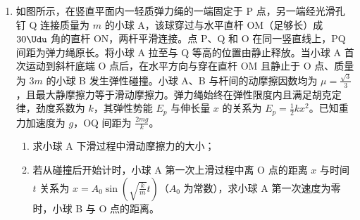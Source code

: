\documentclass[\gkver]{gaokaozhenti}
\begin{document}
\begin{enumerate}
{\begin{enumerate}
\item
$45\Udu$
\end{enumerate}
}

\item
如图所示，在竖直平面内一轻质弹力绳的一端固定于 P 点，另一端经光滑孔钉 Q 连接质量为 $m$ 的小球 A，该球穿过与水平直杆 OM（足够长）成 $30\Udu$ 角的直杆 ON，两杆平滑连接。点 P、Q 和 O 在同一竖直线上，PQ 间距为弹力绳原长。将小球 A 拉至与 Q 等高的位置由静止释放。当小球 A 首次运动到斜杆底端 O 点后，在水平方向与穿在直杆 OM 且静止于 O 点、质量为 $3m$ 的小球 B 发生弹性碰撞。小球 A、B 与杆间的动摩擦因数均为 $\mu = \frac{\sqrt{3}}{3}$，且最大静摩擦力等于滑动摩擦力。弹力绳始终在弹性限度内且满足胡克定律，劲度系数为 $k$，其弹性势能 $E_{p}$ 与伸长量 $x$ 的关系为 $E_{p} = \frac{1}{2}kx^{2}$。已知重力加速度为 $g$，OQ 间距为 $\frac{2mg}{k}$。

\begin{enumerate}
\item
求小球 A 下滑过程中滑动摩擦力的大小；
\item
若从碰撞后开始计时，小球 A 第一次上滑过程中离 O 点的距离 $x$ 与时间 $t$ 关系为 $x = A_{0}\sin\left(\sqrt{\frac{k}{m}}t\right)$（$A_{0}$ 为常数），求小球 A 第一次速度为零时，小球 B 与 O 点的距离。
\end{enumerate}



\end{enumerate}
\end{document}
